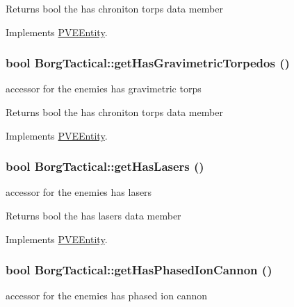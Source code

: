 \begin{DoxyReturn}{Returns}
bool the has chroniton torps data member 
\end{DoxyReturn}


Implements \hyperlink{classPVEEntity}{PVEEntity}.

\hypertarget{classBorgTactical_a9d6b52ebb37608db2a10fd7f690a1103}{
\subsubsection[{getHasGravimetricTorpedos}]{\setlength{\rightskip}{0pt plus 5cm}bool BorgTactical::getHasGravimetricTorpedos ()}}
\label{d0/d4e/classBorgTactical_a9d6b52ebb37608db2a10fd7f690a1103}
accessor for the enemies has gravimetric torps

\begin{DoxyReturn}{Returns}
bool the has chroniton torps data member 
\end{DoxyReturn}


Implements \hyperlink{classPVEEntity}{PVEEntity}.

\hypertarget{classBorgTactical_a8259fa23b1207cd31564bfd1e30781e5}{
\subsubsection[{getHasLasers}]{\setlength{\rightskip}{0pt plus 5cm}bool BorgTactical::getHasLasers ()}}
\label{d0/d4e/classBorgTactical_a8259fa23b1207cd31564bfd1e30781e5}
accessor for the enemies has lasers

\begin{DoxyReturn}{Returns}
bool the has lasers data member 
\end{DoxyReturn}


Implements \hyperlink{classPVEEntity}{PVEEntity}.

\hypertarget{classBorgTactical_ab8ebb12c13c99f80d20fc829298fd05e}{
\subsubsection[{getHasPhasedIonCannon}]{\setlength{\rightskip}{0pt plus 5cm}bool BorgTactical::getHasPhasedIonCannon ()}}
\label{d0/d4e/classBorgTactical_ab8ebb12c13c99f80d20fc829298fd05e}
accessor for the enemies has phased ion cannon

